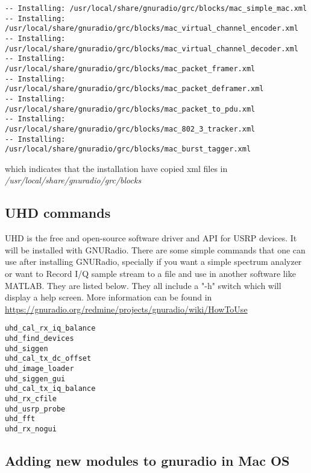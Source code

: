 \begin{footnotesize}
\begin{lstlisting}
-- Installing: /usr/local/share/gnuradio/grc/blocks/mac_simple_mac.xml
-- Installing: /usr/local/share/gnuradio/grc/blocks/mac_virtual_channel_encoder.xml
-- Installing: /usr/local/share/gnuradio/grc/blocks/mac_virtual_channel_decoder.xml
-- Installing: /usr/local/share/gnuradio/grc/blocks/mac_packet_framer.xml
-- Installing: /usr/local/share/gnuradio/grc/blocks/mac_packet_deframer.xml
-- Installing: /usr/local/share/gnuradio/grc/blocks/mac_packet_to_pdu.xml
-- Installing: /usr/local/share/gnuradio/grc/blocks/mac_802_3_tracker.xml
-- Installing: /usr/local/share/gnuradio/grc/blocks/mac_burst_tagger.xml
\end{lstlisting}
\end{footnotesize}
which indicates that the installation have copied xml files in \textit{/usr/local/share/gnuradio/grc/blocks}

\subsection{UHD commands}
UHD is the free and open-source software driver and API for USRP devices. It will be installed with GNURadio. There are some simple commands that one can use after installing GNURadio, specially if you want a simple spectrum analyzer or want to Record I/Q sample stream to a file and use in another software like MATLAB. They are listed below. They all include a "-h" switch which will display a help screen. More information can be found in \url{https://gnuradio.org/redmine/projects/gnuradio/wiki/HowToUse}
\begin{footnotesize}
\begin{lstlisting}
uhd_cal_rx_iq_balance
uhd_find_devices
uhd_siggen
uhd_cal_tx_dc_offset
uhd_image_loader
uhd_siggen_gui
uhd_cal_tx_iq_balance
uhd_rx_cfile
uhd_usrp_probe
uhd_fft     
uhd_rx_nogui     
\end{lstlisting}
\end{footnotesize}

\subsection{Adding new modules to gnuradio in Mac OS}

